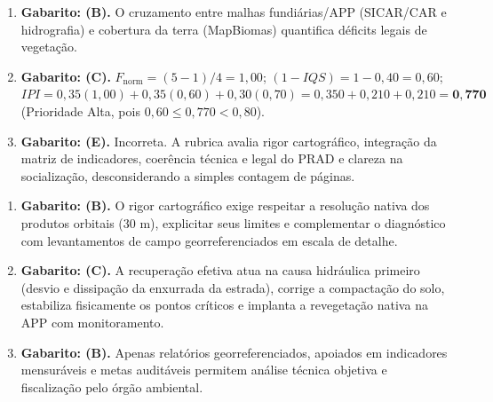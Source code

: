 \begin{boxGabarito}
\begin{enumerate}[leftmargin=1.6em, itemsep=4pt]
  \item \textbf{Gabarito: (B).} O cruzamento entre malhas fundiárias/APP (SICAR/CAR e hidrografia) e cobertura da terra (MapBiomas) quantifica déficits legais de vegetação.
  \item \textbf{Gabarito: (C).} $F_{\text{norm}} = (5 - 1)/4 = 1{,}00$; $(1 - IQS) = 1 - 0{,}40 = 0{,}60$; $IPI = 0{,}35(1{,}00) + 0{,}35(0{,}60) + 0{,}30(0{,}70) = 0{,}350 + 0{,}210 + 0{,}210 = \mathbf{0{,}770}$ (Prioridade Alta, pois $0{,}60 \le 0{,}770 < 0{,}80$).
  \item \textbf{Gabarito: (E).} Incorreta. A rubrica avalia rigor cartográfico, integração da matriz de indicadores, coerência técnica e legal do PRAD e clareza na socialização, desconsiderando a simples contagem de páginas.
\end{enumerate}
\end{boxGabarito}

\begin{boxGabarito}
\begin{enumerate}[leftmargin=1.6em, itemsep=4pt]
  \item \textbf{Gabarito: (B).} O rigor cartográfico exige respeitar a resolução nativa dos produtos orbitais ($30\text{ m}$), explicitar seus limites e complementar o diagnóstico com levantamentos de campo georreferenciados em escala de detalhe.
  \item \textbf{Gabarito: (C).} A recuperação efetiva atua na causa hidráulica primeiro (desvio e dissipação da enxurrada da estrada), corrige a compactação do solo, estabiliza fisicamente os pontos críticos e implanta a revegetação nativa na APP com monitoramento.
  \item \textbf{Gabarito: (B).} Apenas relatórios georreferenciados, apoiados em indicadores mensuráveis e metas auditáveis permitem análise técnica objetiva e fiscalização pelo órgão ambiental.
\end{enumerate}
\end{boxGabarito}

